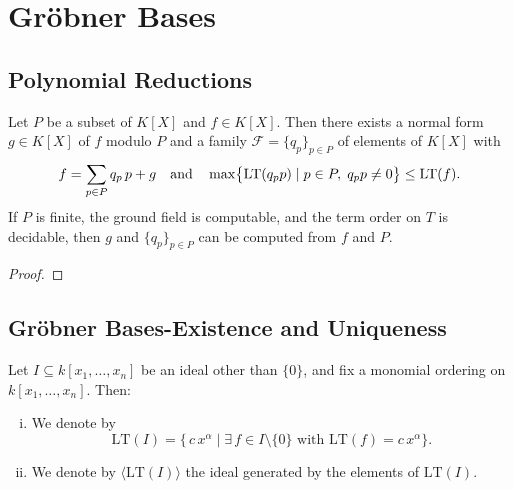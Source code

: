 \chapter{Gr{\"o}bner Bases} 

\section{Polynomial Reductions}

\begin{theorem}
\label{thm:div_alg}
  \leanok
  Let $P$ be a subset of $K[X]$ and $f\in K[X]$.
  Then there exists a normal form $g\in K[X]$ of $f$ modulo $P$ and a family $\mathcal{F}=\{q_{p}\}_{p\in P}$ of elements of $K[X]$ with
  \[
    f=\sum_{p\in P}q_{p}\,p + g
    \quad\text{and}\quad
    \max\bigl\{\operatorname{LT}(q_{p}p)\mid p\in P,\;q_{p}p\neq 0\bigr\}\le \operatorname{LT}(f).
  \]
  If $P$ is finite, the ground field is computable, and the term order on $T$ is decidable, 
  then $g$ and $\{q_{p}\}_{p\in P}$ can be computed from $f$ and $P$.
\end{theorem}
\begin{proof}
  \leanok %
\end{proof}

\section{Gr{\"o}bner Bases-Existence and Uniqueness}

\begin{definition}
  \label{def:initialIdeal}
  \leanok %
  Let \(I\subseteq k[x_1,\dots,x_n]\) be an ideal other than \(\{0\}\), and fix a monomial ordering on \(k[x_1,\dots,x_n]\).  Then:
  \begin{enumerate}[(i)]
    \item We denote by
    \[
      \mathrm{LT}(I)
      =
      \{\,c\,x^\alpha \mid \exists\,f\in I\setminus\{0\}\text{ with }\mathrm{LT}(f)=c\,x^\alpha\}.
    \]
    \item We denote by \(\langle \mathrm{LT}(I)\rangle\) the ideal generated by the elements of \(\mathrm{LT}(I)\).
  \end{enumerate}
\end{definition}

